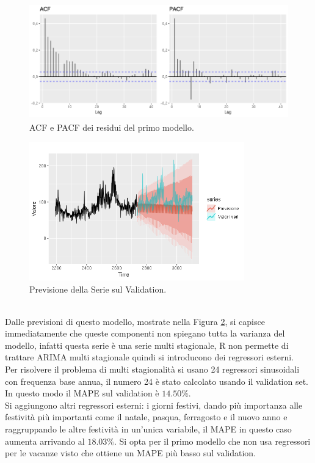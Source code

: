 \documentclass[12pt, onecolumn]{article}
\begin{document}
\begin{figure}[!h]
  \centering
  \includegraphics[width=\linewidth,height=5cm]{imgs/ACF_2.png}
  \caption{ACF e PACF dei residui del primo modello.}
  \label{fig:ACF_2}
\end{figure}
\begin{figure}[!h]
  \centering
  \includegraphics[width=\linewidth,height=6cm]{imgs/forecast_ar_1.png}
  \caption{Previsione della Serie sul Validation.}
  \label{fig:ARIMA_pred}
\end{figure}\\
Dalle previsioni di questo modello, mostrate nella Figura \ref{fig:ARIMA_pred}, si capisce immediatamente che queste componenti non spiegano tutta la varianza del modello, infatti questa serie è una serie multi stagionale, R non permette di trattare ARIMA multi stagionale quindi si introducono dei regressori esterni.\\
Per risolvere il problema di multi stagionalità si usano 24 regressori sinusoidali con frequenza base annua, il numero 24 è stato calcolato usando il validation set.
In questo modo il MAPE sul validation è $14.50\%$.\\
Si aggiungono altri regressori esterni: i giorni festivi, dando più importanza alle festività più importanti come il natale, pasqua, ferragosto e il nuovo anno e raggruppando le altre festività in un'unica variabile, il MAPE in questo caso aumenta arrivando al $18.03\%$.
Si opta per il primo modello che non usa regressori per le vacanze visto che ottiene un MAPE più basso sul validation.
\end{document}
